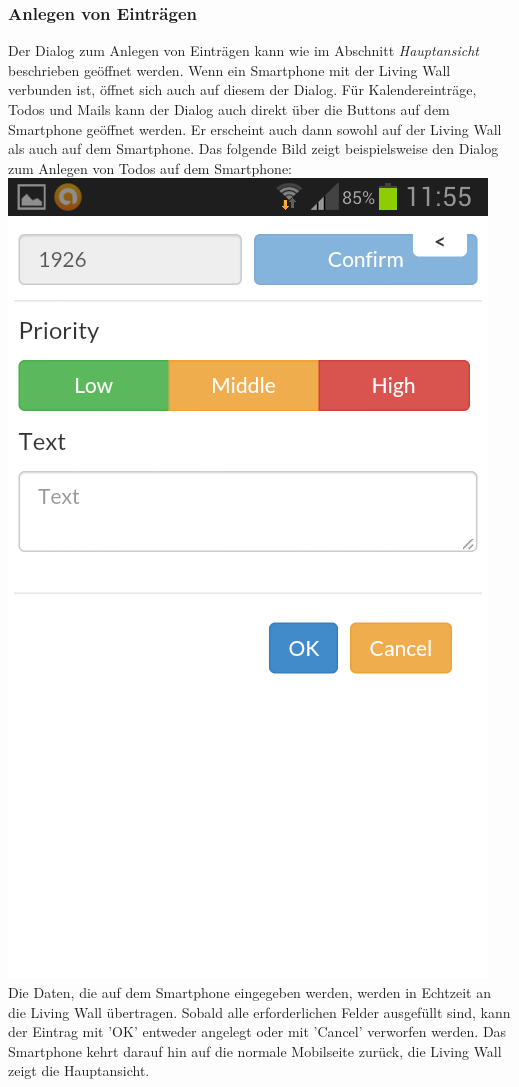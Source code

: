 \documentclass[10pt,a4paper]{report}
\begin{document}
		\subsubsection{Anlegen von Einträgen}
		Der Dialog zum Anlegen von Einträgen kann wie im Abschnitt \textit{Hauptansicht} beschrieben geöffnet werden. Wenn ein Smartphone mit der Living Wall verbunden ist, öffnet sich auch auf diesem der Dialog. Für Kalendereinträge, Todos und Mails kann der Dialog auch direkt über die Buttons auf dem Smartphone geöffnet werden. Er erscheint auch dann sowohl auf der Living Wall als auch auf dem Smartphone. Das folgende Bild zeigt beispielsweise den Dialog zum Anlegen von Todos auf dem Smartphone:\\
		\includegraphics[scale=0.3, trim=0 8cm 0 0]{createTodoMobile}\\
		Die Daten, die auf dem Smartphone eingegeben werden, werden in Echtzeit an die Living Wall übertragen. Sobald alle erforderlichen Felder ausgefüllt sind, kann der Eintrag mit 'OK' entweder angelegt oder mit 'Cancel' verworfen werden. Das Smartphone kehrt darauf hin auf die normale Mobilseite zurück, die Living Wall zeigt die Hauptansicht.
\end{document}
